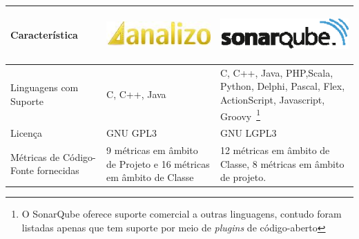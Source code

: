 \begin{savenotes}
\begin{table}[!ht]
\centering
\begin{tabular}{|p{5cm}|p{4.5cm}|p{5cm}|}
\hline

Característica 

&

\begin{center}
\includegraphics[keepaspectratio=false,scale=0.48]{figuras/analizo.eps} 
\end{center}


&



\begin{center}
\includegraphics[keepaspectratio=false,scale=0.48]{figuras/sonarqube.eps} 
\end{center}





   
\\ \hline


Linguagens com Suporte  & C, C++, Java & C, C++, Java, PHP,Scala, Python, Delphi, Pascal, Flex, ActionScript, Javascript, Groovy~\footnote{O SonarQube oferece suporte comercial a outras linguagens, contudo foram listadas apenas que tem suporte por meio de \textit{plugins} de código-aberto} \\ \hline
Licença  & GNU GPL3 & GNU LGPL3  \\ \hline




Métricas de Código-Fonte fornecidas  & 9 métricas em âmbito de Projeto e 16 métricas em âmbito de Classe \cite{Meirelles2013} & 12 métricas em âmbito de Classe, 8 métricas em âmbito de projeto. \\ \hline



\end{tabular}
\end{table}
\end{savenotes}
